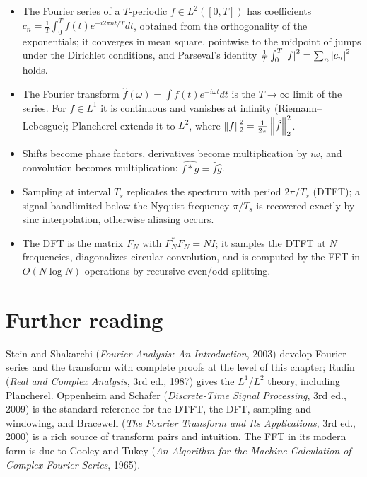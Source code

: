 \begin{notechapter}
\begin{chaptersummary}
\begin{itemize}
\item The Fourier series of a $T$-periodic $f \in L^2([0,T])$ has coefficients $c_n = \frac1T\int_0^T f(t)e^{-i2\pi nt/T}dt$, obtained from the orthogonality of the exponentials; it converges in mean square, pointwise to the midpoint of jumps under the Dirichlet conditions, and Parseval's identity $\frac1T\int_0^T\left|f\right|^2 = \sum_n\left|c_n\right|^2$ holds.
\item The Fourier transform $\hat f(\omega) = \int f(t)e^{-i\omega t}dt$ is the $T\to\infty$ limit of the series. For $f\in L^1$ it is continuous and vanishes at infinity (Riemann--Lebesgue); Plancherel extends it to $L^2$, where $\left\|f\right\|_2^2 = \frac1{2\pi}\left\|\hat f\right\|_2^2$.
\item Shifts become phase factors, derivatives become multiplication by $i\omega$, and convolution becomes multiplication: $\widehat{f*g} = \hat f\hat g$.
\item Sampling at interval $T_s$ replicates the spectrum with period $2\pi/T_s$ (DTFT); a signal bandlimited below the Nyquist frequency $\pi/T_s$ is recovered exactly by sinc interpolation, otherwise aliasing occurs.
\item The DFT is the matrix $F_N$ with $F_N^*F_N = NI$; it samples the DTFT at $N$ frequencies, diagonalizes circular convolution, and is computed by the FFT in $O(N\log N)$ operations by recursive even/odd splitting.
\end{itemize}
\end{chaptersummary}

\section*{Further reading}
Stein and Shakarchi (\emph{Fourier Analysis: An Introduction}, 2003) develop Fourier series and the transform with complete proofs at the level of this chapter; Rudin (\emph{Real and Complex Analysis}, 3rd ed., 1987) gives the $L^1$/$L^2$ theory, including Plancherel. Oppenheim and Schafer (\emph{Discrete-Time Signal Processing}, 3rd ed., 2009) is the standard reference for the DTFT, the DFT, sampling and windowing, and Bracewell (\emph{The Fourier Transform and Its Applications}, 3rd ed., 2000) is a rich source of transform pairs and intuition. The FFT in its modern form is due to Cooley and Tukey (\emph{An Algorithm for the Machine Calculation of Complex Fourier Series}, 1965).


\end{notechapter}
